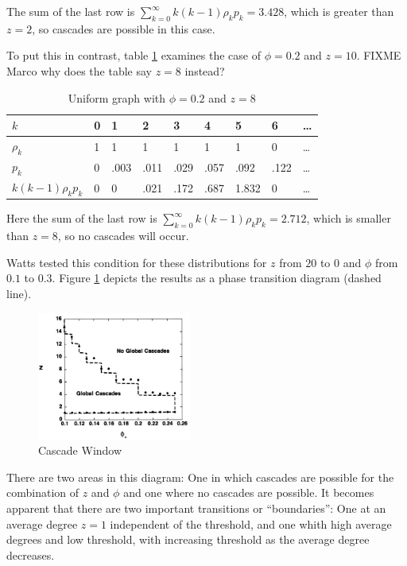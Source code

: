 \documentclass{sig-alternate-05-2015}
\begin{document}
The sum of the last row is $\sum_{k=0}^\infty k (k-1) \rho_k p_k = 3.428$, which is greater than $z = 2$, so cascades are possible in this case.

To put this in contrast, table \ref{tab:z8} examines the case of $\phi = 0.2$ and $z = 10$. FIXME Marco why does the table say $z = 8$ instead?

\begin{table}
\centering
\caption{Uniform graph with $\phi = 0.2$ and $z = 8$}
\label{tab:z8}
\begin{tabular}{|l|l|l|l|l|l|l|l|l|}
\hline
$k$                       & 0  & 1     & 2     & 3     & 4     & 5      & 6     & \ldots\\ \hline
$\rho_k$                  & 1  & 1     & 1     & 1     & 1     & 1      & 0     & \ldots\\ \hline
$p_k$                     & 0  & .003  & .011  & .029  & .057  & .092   & .122  & \ldots\\ \hline
$k (k-1) \rho_k p_k$      & 0  & 0     & .021  & .172  & .687  & 1.832  & 0     & \ldots\\ \hline
\end{tabular}
\end{table}

Here the sum of the last row is $\sum_{k=0}^\infty k (k-1) \rho_k p_k = 2.712$, which is smaller than $z = 8$, so no cascades will occur.

Watts tested this condition for these distributions for $z$ from $20$ to $0$ and $\phi$ from $0.1$ to $0.3$. Figure \ref{fig:cascade-window} depicts the results as a phase transition diagram (dashed line).

\begin{figure}[h!]
  \centering
  \includegraphics[width=0.45\textwidth]{img/cascade-regimes.png}
  \caption{Cascade Window}
  \label{fig:cascade-window}
\end{figure}

There are two areas in this diagram: One in which cascades are possible for the combination of $z$ and $\phi$ and one where no cascades are possible. It becomes apparent that there are two important transitions or ``boundaries'': One at an average degree $z = 1$ independent of the threshold, and one whith high average degrees and low threshold, with increasing threshold as the average degree decreases.
\end{document}
